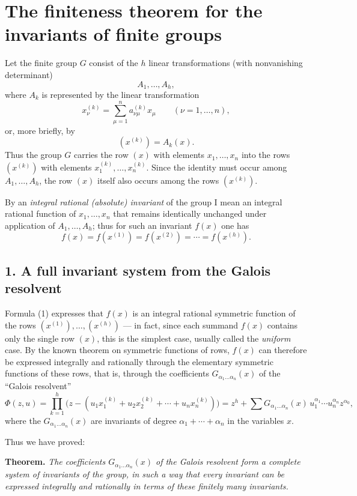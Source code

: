 \documentclass[11pt]{article}
\begin{document}
\section*{The finiteness theorem for the invariants of finite groups}

Let the finite group $G$ consist of the $h$ linear transformations (with nonvanishing determinant)
\[
A_1,\dots,A_h,
\]
where $A_k$ is represented by the linear transformation
\[
x^{(k)}_\nu=\sum_{\mu=1}^n a^{(k)}_{\nu\mu}x_\mu
\qquad (\nu=1,\dots,n),
\]
or, more briefly, by
\[
(x^{(k)})=A_k(x).
\]
Thus the group $G$ carries the row $(x)$ with elements $x_1,\dots,x_n$ into the rows $(x^{(k)})$ with elements $x^{(k)}_1,\dots,x^{(k)}_n$. Since the identity must occur among $A_1,\dots,A_h$, the row $(x)$ itself also occurs among the rows $(x^{(k)})$.

By an \emph{integral rational (absolute) invariant} of the group I mean an integral rational function of $x_1,\dots,x_n$ that remains identically unchanged under application of $A_1,\dots,A_h$; thus for such an invariant $f(x)$ one has
\[
f(x)=f(x^{(1)})=f(x^{(2)})=\cdots=f(x^{(h)}).
\tag{1}
\]

\subsection*{1. A full invariant system from the Galois resolvent}

Formula \textup{(1)} expresses that $f(x)$ is an integral rational symmetric function of the rows $(x^{(1)}),\dots,(x^{(h)})$ --- in fact, since each summand $f(x)$ contains only the single row $(x)$, this is the simplest case, usually called the \emph{uniform} case. By the known theorem on symmetric functions of rows, $f(x)$ can therefore be expressed integrally and rationally through the elementary symmetric functions of these rows, that is, through the coefficients $G_{\alpha_1\dots\alpha_n}(x)$ of the ``Galois resolvent''
\[
\Phi(z,u)=\prod_{k=1}^h\bigl(z-(u_1x^{(k)}_1+u_2x^{(k)}_2+\cdots+u_nx^{(k)}_n)\bigr)
      = z^h+\sum G_{\alpha_1\dots\alpha_n}(x)\,u_1^{\alpha_1}\cdots u_n^{\alpha_n} z^{\alpha_0},
\tag{2}
\]
where the $G_{\alpha_1\dots\alpha_n}(x)$ are invariants of degree $\alpha_1+\cdots+\alpha_n$ in the variables $x$.

Thus we have proved:

\medskip
\noindent
\textbf{Theorem.}
\emph{The coefficients $G_{\alpha_1\dots\alpha_n}(x)$ of the Galois resolvent form a complete system of invariants of the group, in such a way that every invariant can be expressed integrally and rationally in terms of these finitely many invariants.}
\end{document}
